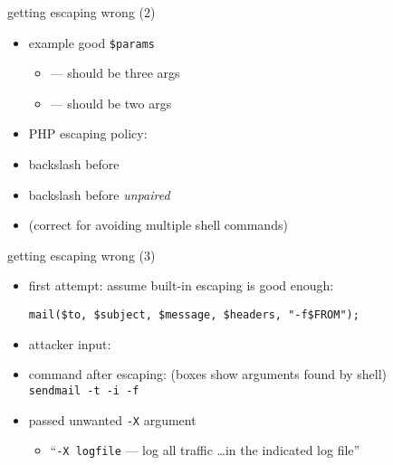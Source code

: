 \begin{frame}[fragile,label=wrongEscaping2]{getting escaping wrong (2)}
    \begin{itemize}
    \item example good \texttt{\$params}
        \begin{itemize}
            \item {} --- should be three args
            \item {} --- should be two args
        \end{itemize}
    \vspace{.5cm}
    \item<2> PHP escaping policy:
    \item<2> backslash before  
    \item<2> backslash before \textit{unpaired} 
    \item<2> (correct for avoiding multiple shell commands)
    \end{itemize}
\end{frame}

\begin{frame}[fragile,label=wrongEscaping3]{getting escaping wrong (3)}
    \begin{itemize}
    \item first attempt: assume built-in escaping is good enough:
\begin{verbatim}
mail($to, $subject, $message, $headers, "-f$FROM");
\end{verbatim}
    \item attacker input: 
    \item command after escaping: (boxes show arguments found by shell)\\
        {\fontsize{11}{11}\texttt{sendmail -t -i -f  }}
    \item passed unwanted \texttt{-X} argument 
        \begin{itemize}
            \item ``\texttt{-X logfile} --- log all traffic \ldots in the indicated log file''
        \end{itemize}
    \end{itemize}
\end{frame}

